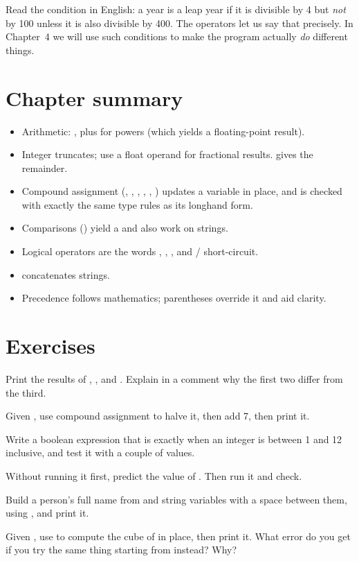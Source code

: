 Read the condition in English: a year is a leap year if it is divisible by 4 but
\emph{not} by 100 unless it is also divisible by 400. The operators let us say
that precisely. In Chapter~4 we will use such conditions to make the program
actually \emph{do} different things.

\section{Chapter summary}

\begin{itemize}[leftmargin=1.4em]
  \item Arithmetic: \code{+ - * / \%}, plus \code{**} for powers (which yields a
        floating-point result).
  \item Integer \code{/} truncates; use a float operand for fractional results.
        \code{\%} gives the remainder.
  \item Compound assignment (\code{+=}, \code{-=}, \code{*=}, \code{/=},
        \code{\%=}, \code{**=}) updates a  variable in place, and is
        checked with exactly the same type rules as its longhand form.
  \item Comparisons (\code{== != < > <= >=}) yield a  and also work on
        strings.
  \item Logical operators are the words , , , and
        / short-circuit.
  \item \code{+} concatenates strings.
  \item Precedence follows mathematics; parentheses override it and aid clarity.
\end{itemize}

\section{Exercises}

\exercise Print the results of , , and
. Explain in a comment why the first two differ from the third.

\exercise Given , use compound assignment to halve it, then
add 7, then print it.

\exercise Write a boolean expression that is  exactly when an integer
 is between 1 and 12 inclusive, and test it with a couple of values.

\exercise Without running it first, predict the value of
. Then run it and check.

\exercise Build a person's full name from  and  string
variables with a space between them, using \code{+}, and print it.

\exercise Given , use \code{**=} to compute the cube
of  in place, then print it. What error do you get if you try the
same thing starting from  instead? Why?
